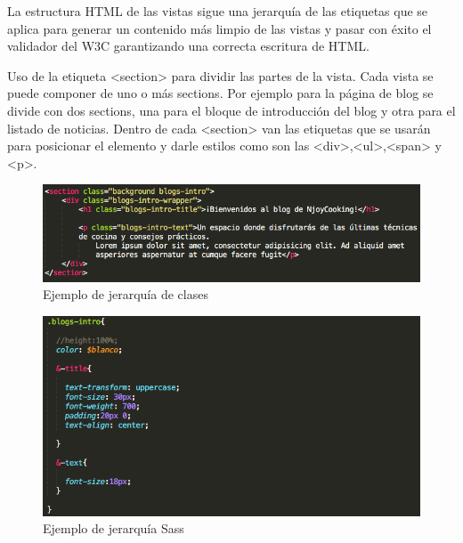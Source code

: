 La estructura HTML de las vistas sigue una jerarquía de las etiquetas que se aplica para generar un contenido más limpio de las vistas y pasar con éxito el validador del W3C garantizando una correcta escritura de HTML.

\vspace{5 mm}


Uso de la etiqueta <section> para dividir las partes de la vista. Cada vista se puede componer de uno o más sections. Por ejemplo para la página de blog se divide con dos sections, una para el bloque de introducción del blog y otra para el listado de noticias. Dentro de cada <section> van las etiquetas que se usarán para posicionar el elemento y darle estilos como son las <div>,<ul>,<span> y <p>.

\vspace{5 mm}

\begin{figure}
\begin{center}
\includegraphics[width=1.0\textwidth]{imagenes/jerarquia-clases.png}
\caption{Ejemplo de jerarquía de clases}
\label{clases-html}
\end{center}
\end{figure}

\begin{figure}
\begin{center}
\includegraphics[width=1.0\textwidth]{imagenes/jerarquia-sass.png}
\caption{Ejemplo de jerarquía Sass}
\label{jerarquia-sass}
\end{center}
\end{figure}

